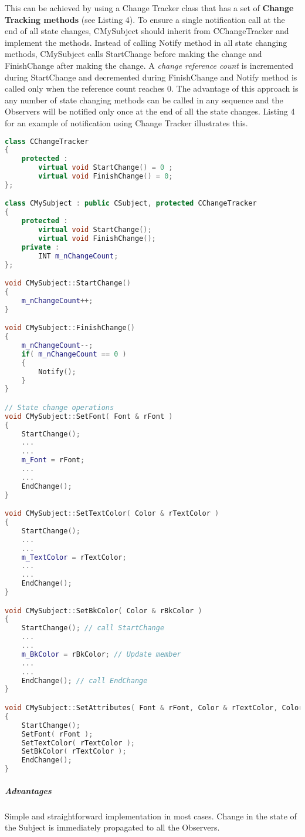 \documentclass{book}
\begin{document}
This can be achieved by using a Change Tracker class that has a set of \textbf{Change Tracking methods} (see Listing 4).
To ensure a single notification call at the end of all state changes, CMySubject should inherit from CChangeTracker and implement the methods.
Instead of calling Notify method in all state changing methods, CMySubject calls StartChange before making the change and FinishChange after making the change.
A \textit{change reference count} is incremented during StartChange and decremented during FinishChange and Notify method is called only when the reference count reaches 0.
The advantage of this approach is any number of state changing methods can be called in any sequence and the Observers will be notified only once at the end of all the state changes.
Listing 4 for an example of notification using Change Tracker illustrates this.
\begin{lstlisting}[caption={Listing 4 -Notification using Change Tracker},language=C++]
class CChangeTracker
{
	protected :
		virtual void StartChange() = 0 ;
		virtual void FinishChange() = 0;
};

class CMySubject : public CSubject, protected CChangeTracker
{
	protected :
		virtual void StartChange();
		virtual void FinishChange();
	private :
		INT m_nChangeCount;
};

void CMySubject::StartChange()
{
	m_nChangeCount++;
}

void CMySubject::FinishChange()
{
	m_nChangeCount--;
	if( m_nChangeCount == 0 )
	{
		Notify();
	}
}

// State change operations
void CMySubject::SetFont( Font & rFont )
{
	StartChange();
	...
	...
	m_Font = rFont;
	...
	...
	EndChange();
}

void CMySubject::SetTextColor( Color & rTextColor )
{
	StartChange();
	...
	...
	m_TextColor = rTextColor;
	...
	...
	EndChange();
}

void CMySubject::SetBkColor( Color & rBkColor )
{
	StartChange(); // call StartChange
	...
	...
	m_BkColor = rBkColor; // Update member
	...
	...
	EndChange(); // call EndChange
}

void CMySubject::SetAttributes( Font & rFont, Color & rTextColor, Color & rBkColor )
{
	StartChange();
   	SetFont( rFont );
   	SetTextColor( rTextColor );
   	SetBkColor( rTextColor );
	EndChange();
}
\end{lstlisting}

\subparagraph{Advantages}

    Simple and straightforward implementation in most cases.
    Change in the state of the Subject is immediately propagated to all the Observers.
\end{document}
